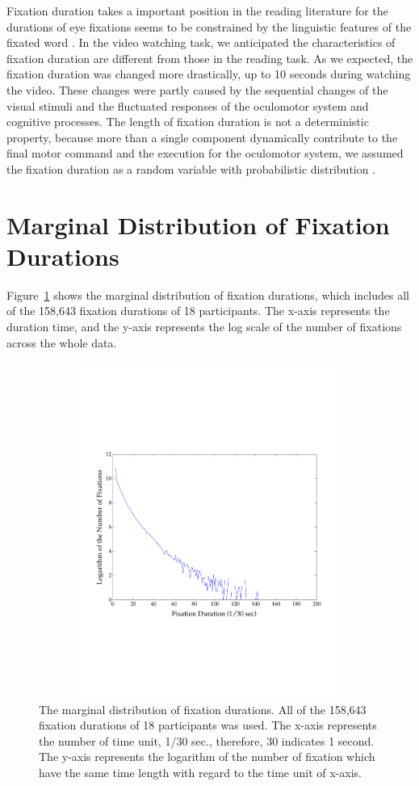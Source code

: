 \documentclass[oneside,master]{snueethesis}
\begin{document}
Fixation duration takes a important position in the reading literature for the durations of eye fixations seems to be constrained by the linguistic features of the fixated word \cite{Rayner1986,Inhoff1986}. In the video watching task, we anticipated the characteristics of fixation duration are different from those in the reading task. As we expected, the fixation duration was changed more drastically, up to 10 seconds during watching the video. These changes were partly caused by the sequential changes of the visual stimuli and the fluctuated responses of the oculomotor system and cognitive processes. The length of fixation duration is not a deterministic property, because more than a single component dynamically contribute to the final motor command and the execution for the oculomotor system, we assumed the fixation duration as a random variable with probabilistic distribution \cite{Rayner1998,Reichle2004,Reichle2006}.


\section{Marginal Distribution of Fixation Durations}

Figure~\ref{fig:marginal-fixation-duration} shows the marginal distribution of fixation durations, which includes all of the 158,643 fixation durations of 18 participants. The x-axis represents the duration time, and the y-axis represents the log scale of the number of fixations across the whole data.

\begin{figure}
  \centerline{\includegraphics[width=150mm,height=110mm,trim=0mm 60mm 0mm 60mm]{./eps/marginal_fixation_duration.pdf}}
  \caption[The marginal distribution of fixation durations]{The marginal distribution of fixation durations. All of the 158,643 fixation durations of 18 participants was used. The x-axis represents the number of time unit, 1/30 sec., therefore, 30 indicates 1 second. The y-axis represents the logarithm of the number of fixation which have the same time length with regard to the time unit of x-axis.}
  \label{fig:marginal-fixation-duration}
\end{figure}
\end{document}
